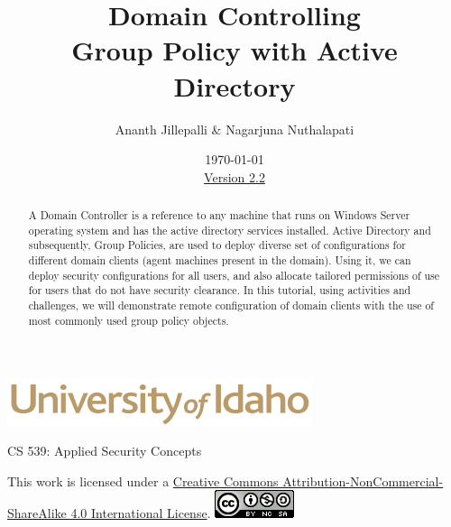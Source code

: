 \documentclass[12pt]{extarticle}
\begin{document}
\title{ Domain Controlling \\ \large Group Policy with Active Directory}
\author{Ananth Jillepalli \& Nagarjuna Nuthalapati}
\date{\today \\ \hyperref[changelog]{Version 2.2}} 
\renewcommand{\abstractname}{Summary}
\begin{titlepage}
\maketitle
{}
\begin{center}
\includegraphics[scale=.5]{UofI}

\large{CS 539: Applied Security Concepts}

\vskip 40pt

\end{center}
\begin{abstract}
A Domain Controller is a reference to any machine that runs on Windows Server operating system and has the active directory services installed. Active Directory and subsequently, Group Policies, are used to deploy diverse set of configurations for different domain clients (agent machines present in the domain). Using it, we can deploy security configurations for all users, and also allocate tailored permissions of use for users that do not have security clearance. In this tutorial, using activities and challenges, we will demonstrate remote configuration of domain clients with the use of most commonly used group policy objects.   
\end{abstract}


\vfill
\begin{center}
This work is licensed under a \href{https://creativecommons.org/licenses/by-nc-sa/4.0/legalcode}{Creative Commons Attribution-NonCommercial-ShareAlike 4.0 International License}.
\vskip 10pt
\includegraphics[scale=.5]{cc}
\end{center}

\end{titlepage}


\pagebreak
\tableofcontents
\end{document}
